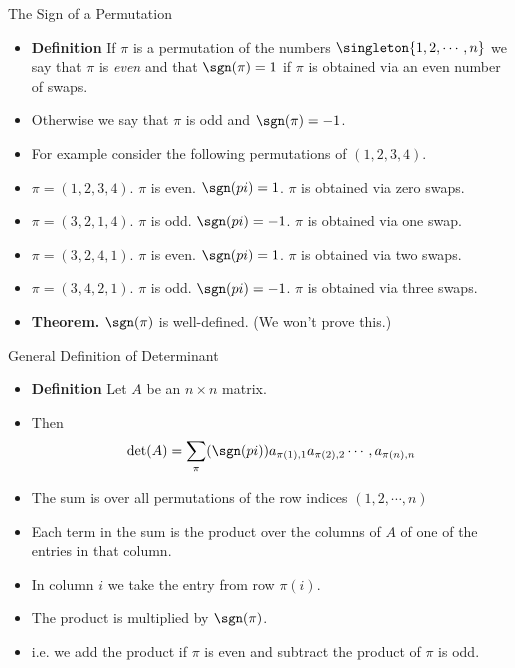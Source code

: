 \documentclass{beamer}
\begin{document}

\begin{frame}{The Sign of a Permutation}

\begin{itemize}
\item \textbf{Definition} If $\pi$ is a permutation of the numbers $\singleton{1,2,\cdots, n}$
we say that $\pi$ is \emph{even} and that $\sgn(\pi) = 1$ if $\pi$ is obtained via an even number of swaps.
\item Otherwise we say that $\pi$ is odd and $\sgn(\pi) = -1$.
\item For example consider the following permutations of $(1,2,3,4)$.
\item $\pi=(1,2,3,4)$. $\pi$ is even. $\sgn(pi) = 1$. $\pi$ is obtained via zero swaps.
\item $\pi=(3,2,1,4)$. $\pi$ is odd. $\sgn(pi) = -1$. $\pi$ is obtained via one swap.
\item $\pi=(3,2,4,1)$. $\pi$ is even. $\sgn(pi) = 1$. $\pi$ is obtained via two swaps.
\item $\pi=(3,4,2,1)$. $\pi$ is odd. $\sgn(pi) = -1$. $\pi$ is obtained via three swaps.
\item \textbf{Theorem.} $\sgn(\pi)$ is well-defined. (We won't prove this.)
\end{itemize}
\end{frame}


\begin{frame}{General Definition of Determinant}

\begin{itemize}
\item \textbf{Definition} Let $A$ be an $n\times n$ matrix.
\item Then
$$\det(A) = \sum_{\pi} (\sgn(pi)) a_{\pi(1),1} a_{\pi(2), 2} \cdots, a_{\pi(n), n}$$
\item The sum is over all permutations of the row indices $(1,2,\cdots, n)$
\item Each term in the sum is the product over the columns of $A$ of one of the entries in that column.
\item In column $i$ we take the entry from row $\pi(i)$.
\item The product is multiplied by $\sgn(\pi)$.
\item i.e. we add the product if $\pi$ is even and subtract the product of $\pi$ is odd.
\end{itemize}
\end{frame}
\end{document}
